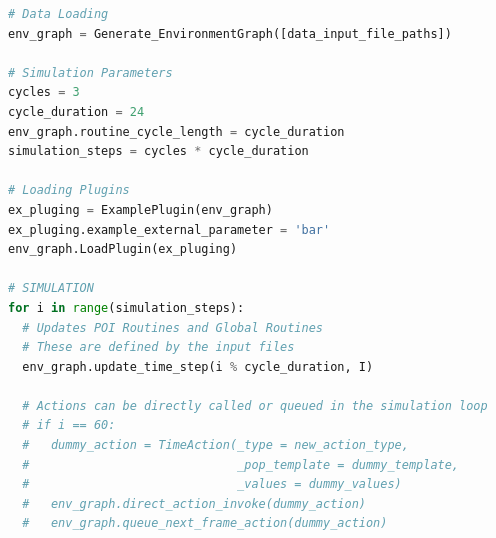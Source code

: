 \documentclass[pdflatex,sn-mathphys-num]{sn-jnl}%
\theoremstyle{thmstyleone}%
\theoremstyle{thmstyletwo}%
\theoremstyle{thmstylethree}%
\begin{document}
\begin{appendices}
\begin{lstlisting}[caption={Simulation script example.},captionpos=b, label={lst:simulator}, basicstyle=\footnotesize, language=Python]
# Data Loading
env_graph = Generate_EnvironmentGraph([data_input_file_paths])

# Simulation Parameters
cycles = 3
cycle_duration = 24
env_graph.routine_cycle_length = cycle_duration
simulation_steps = cycles * cycle_duration

# Loading Plugins
ex_pluging = ExamplePlugin(env_graph)
ex_pluging.example_external_parameter = 'bar'
env_graph.LoadPlugin(ex_pluging)

# SIMULATION
for i in range(simulation_steps):
  # Updates POI Routines and Global Routines
  # These are defined by the input files
  env_graph.update_time_step(i % cycle_duration, I)
  
  # Actions can be directly called or queued in the simulation loop
  # if i == 60:
  #   dummy_action = TimeAction(_type = new_action_type,
  #                             _pop_template = dummy_template,
  #                             _values = dummy_values)
  #   env_graph.direct_action_invoke(dummy_action)
  #   env_graph.queue_next_frame_action(dummy_action)
\end{lstlisting}





\end{appendices}


\end{document}
